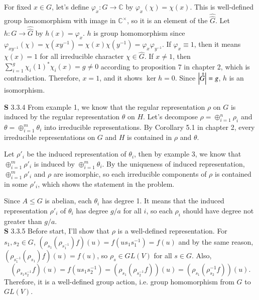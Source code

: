 \documentclass[a4paper, 12pt]{article}
\theoremstyle{Mydefinition}
\theoremstyle{Mytheorem}
\begin{document}
For fixed $x\in G$, let's define $\varphi_x:\hat{G}\rightarrow \mathbb{C}$ by $\varphi_x(\chi) = \chi(x)$. This is well-defined group homomorphism with image in $\mathbb{C}^\times$, so it is an element of the $\hat{\hat{G}}$. Let $h:G\rightarrow \hat{\hat{G}}$ by $h(x) = \varphi_x$. $h$ is group homomorphism since $\varphi_{xy^{-1}}(\chi) = \chi(xy^{-1}) = \chi(x)\chi(y^{-1}) = \varphi_x\varphi_{y^{-1}}$. If $\varphi_x \equiv 1$, then it means $\chi(x) = 1$ for all irreducible character $\chi\in \hat{G}$. If $x\neq 1$, then $\sum_{i=1}^g\chi_i(1)^*\chi_i(x) = g\neq 0$ according to proposition 7 in chapter 2, which is contradiction. Therefore, $x=1$, and it shows $\ker h = 0$. Since $\abs{\hat{\hat{G}}}=g$, $h$ is an isomorphism.

\newpage


\noindent \textbf{S} 3.3.4
From example 1, we know that the regular representation $\rho$ on $G$ is induced by the regular representation $\theta$ on $H$. Let's decompose $\rho=\oplus_{i=1}^n \rho_i$ and $\theta = \oplus_{i=1}^m \theta_i$ into irreducible representations. By Corollary 5.1 in chapter 2, every irreducible representations on $G$ and $H$ is contained in $\rho$ and $\theta$.

Let $\rho'_i$ be the induced representation of $\theta_i$, then by example 3, we know that $\oplus_{i=1}^m \rho'_i$ is induced by $\oplus_{i=1}^m \theta_i$. By the uniqueness of induced representation, $\oplus_{i=1}^m \rho'_i$ and $\rho$ are isomorphic, so each irreducible components of $\rho$ is contained in some $\rho'_i$, which shows the statement in the problem.

Since $A\leq G$ is abelian, each $\theta_i$ has degree 1. It means that the induced representation $\rho'_i$ of $\theta_i$ has degree $g/a$ for all $i$, so each $\rho_i$ should have degree not greater than $g/a$.\\

\noindent \textbf{S} 3.3.5
Before start, I'll show that $\rho$ is a well-defined representation. For $s_1,s_2\in G$, $(\rho_{s_1}(\rho_{s^{-1}_1})f)(u) = f(us_1s_1^{-1}) = f(u)$ and by the same reason, $(\rho_{s^{-1}_1}(\rho_{s_1})f)(u) = f(u)$, so $\rho_s\in GL(V)$ for all $s\in G$. Also,
\begin{equation}
    (\rho_{s_1s^{-1}_2}f)(u) = f(us_1s^{-1}_2) = (\rho_{s_1}(\rho_{s^{-1}_2}f))(u) = (\rho_{s_1}(\rho^{-1}_{s_2}f))(u).
\end{equation}
Therefore, it is a well-defined group action, i.e. group homomorphism from $G$ to $GL(V)$.
\end{document}
